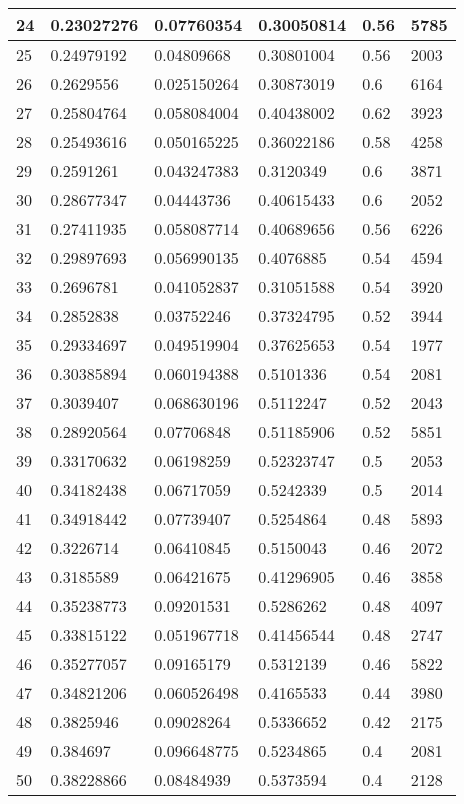 \begin{longtable}{|l|l|l|l|l|l|}
24 & 0.23027276 & 0.07760354 & 0.30050814 & 0.56 & 5785 \\ \hline 
25 & 0.24979192 & 0.04809668 & 0.30801004 & 0.56 & 2003 \\ \hline 
26 & 0.2629556 & 0.025150264 & 0.30873019 & 0.6 & 6164 \\ \hline 
27 & 0.25804764 & 0.058084004 & 0.40438002 & 0.62 & 3923 \\ \hline 
28 & 0.25493616 & 0.050165225 & 0.36022186 & 0.58 & 4258 \\ \hline 
29 & 0.2591261 & 0.043247383 & 0.3120349 & 0.6 & 3871 \\ \hline 
30 & 0.28677347 & 0.04443736 & 0.40615433 & 0.6 & 2052 \\ \hline 
31 & 0.27411935 & 0.058087714 & 0.40689656 & 0.56 & 6226 \\ \hline 
32 & 0.29897693 & 0.056990135 & 0.4076885 & 0.54 & 4594 \\ \hline 
33 & 0.2696781 & 0.041052837 & 0.31051588 & 0.54 & 3920 \\ \hline 
34 & 0.2852838 & 0.03752246 & 0.37324795 & 0.52 & 3944 \\ \hline 
35 & 0.29334697 & 0.049519904 & 0.37625653 & 0.54 & 1977 \\ \hline 
36 & 0.30385894 & 0.060194388 & 0.5101336 & 0.54 & 2081 \\ \hline 
37 & 0.3039407 & 0.068630196 & 0.5112247 & 0.52 & 2043 \\ \hline 
38 & 0.28920564 & 0.07706848 & 0.51185906 & 0.52 & 5851 \\ \hline 
39 & 0.33170632 & 0.06198259 & 0.52323747 & 0.5 & 2053 \\ \hline 
40 & 0.34182438 & 0.06717059 & 0.5242339 & 0.5 & 2014 \\ \hline 
41 & 0.34918442 & 0.07739407 & 0.5254864 & 0.48 & 5893 \\ \hline 
42 & 0.3226714 & 0.06410845 & 0.5150043 & 0.46 & 2072 \\ \hline 
43 & 0.3185589 & 0.06421675 & 0.41296905 & 0.46 & 3858 \\ \hline 
44 & 0.35238773 & 0.09201531 & 0.5286262 & 0.48 & 4097 \\ \hline 
45 & 0.33815122 & 0.051967718 & 0.41456544 & 0.48 & 2747 \\ \hline 
46 & 0.35277057 & 0.09165179 & 0.5312139 & 0.46 & 5822 \\ \hline 
47 & 0.34821206 & 0.060526498 & 0.4165533 & 0.44 & 3980 \\ \hline 
48 & 0.3825946 & 0.09028264 & 0.5336652 & 0.42 & 2175 \\ \hline 
49 & 0.384697 & 0.096648775 & 0.5234865 & 0.4 & 2081 \\ \hline 
50 & 0.38228866 & 0.08484939 & 0.5373594 & 0.4 & 2128 \\ \hline 
\end{longtable}